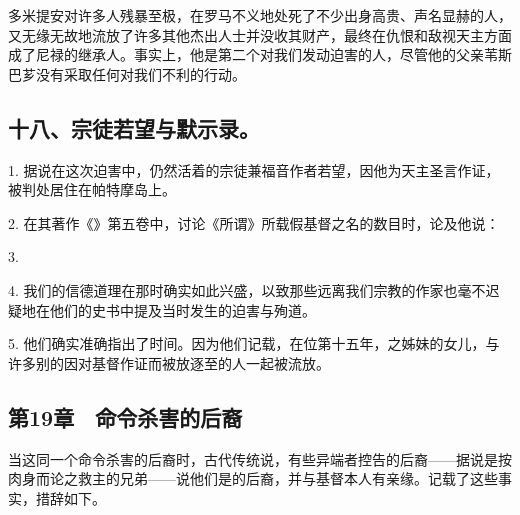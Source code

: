 多米提安对许多人残暴至极，在罗马不义地处死了不少出身高贵、声名显赫的人，又无缘无故地流放了许多其他杰出人士并没收其财产，最终在仇恨和敌视天主方面成了尼禄的继承人。事实上，他是第二个对我们发动迫害的人，尽管他的父亲苇斯巴芗没有采取任何对我们不利的行动。\par


\subsection{十八、宗徒若望与默示录。}

1. 据说在这次迫害中，仍然活着的宗徒兼福音作者若望，因他为天主圣言作证，被判处居住在帕特摩岛上。\par

2. 在其著作《》第五卷中，讨论《所谓》所载假基督之名的数目时，论及他说：\par

3. \par

4. 我们的信德道理在那时确实如此兴盛，以致那些远离我们宗教的作家也毫不迟疑地在他们的史书中提及当时发生的迫害与殉道。\par

5. 他们确实准确指出了时间。因为他们记载，在位第十五年，之姊妹的女儿，与许多别的因对基督作证而被放逐至的人一起被流放。\par


\subsection{第19章　命令杀害的后裔}

当这同一个命令杀害的后裔时，古代传统说，有些异端者控告的后裔——据说是按肉身而论之救主的兄弟——说他们是的后裔，并与基督本人有亲缘。记载了这些事实，措辞如下。\par



